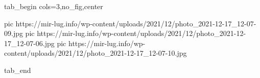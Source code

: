  
 
 
 
 


\ifcmt
  tab_begin cols=3,no_fig,center

     pic https://mir-lug.info/wp-content/uploads/2021/12/photo_2021-12-17_12-07-09.jpg
		 pic https://mir-lug.info/wp-content/uploads/2021/12/photo_2021-12-17_12-07-06.jpg
		 pic https://mir-lug.info/wp-content/uploads/2021/12/photo_2021-12-17_12-07-10.jpg

  tab_end
\fi
